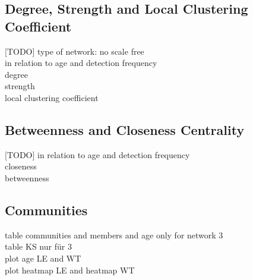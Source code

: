 \subsection{Degree, Strength and Local Clustering Coefficient}
[TODO]
type of network: no scale free\\
in relation to age and detection frequency\\
degree\\
strength\\
local clustering coefficient\\

\subsection{Betweenness and Closeness Centrality}
[TODO]
in relation to age and detection frequency\\
closeness\\
betweenness\\

\subsection{Communities}




table communities and members and age only for network 3\\
table KS nur für 3\\
plot age LE and WT\\
plot heatmap LE and heatmap WT\\